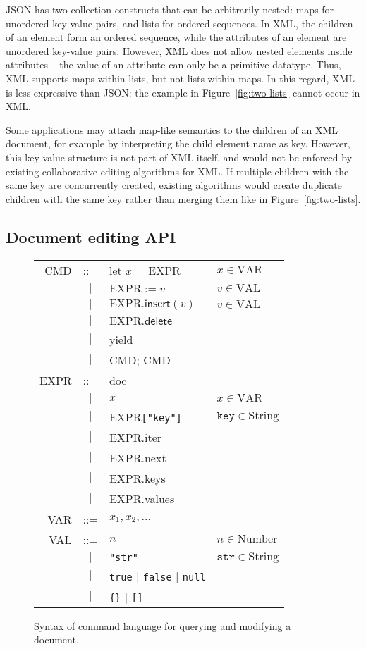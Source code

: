 \documentclass[10pt,journal,compsoc]{IEEEtran}
\begin{document}
JSON has two collection constructs that can be arbitrarily nested: maps for unordered key-value pairs, and lists for ordered sequences. In XML, the children of an element form an ordered sequence, while the attributes of an element are unordered key-value pairs. However, XML does not allow nested elements inside attributes -- the value of an attribute can only be a primitive datatype. Thus, XML supports maps within lists, but not lists within maps. In this regard, XML is less expressive than JSON: the example in Figure~\ref{fig:two-lists} cannot occur in XML.

Some applications may attach map-like semantics to the children of an XML document, for example by interpreting the child element name as key. However, this key-value structure is not part of XML itself, and would not be enforced by existing collaborative editing algorithms for XML. If multiple children with the same key are concurrently created, existing algorithms would create duplicate children with the same key rather than merging them like in Figure~\ref{fig:two-lists}.

\subsection{Document editing API}\label{sec:editing-api}

\begin{figure}
\centering
\begin{tabular}{rcll}
CMD & ::= & \textsf{let} $x$ = EXPR & $x \in \mathrm{VAR}$ \\
& $|$ & $\mathrm{EXPR} := v$ & $v \in \mathrm{VAL}$ \\
& $|$ & $\mathrm{EXPR}.\mathsf{insert}(v)$ & $v \in \mathrm{VAL}$ \\
& $|$ & $\mathrm{EXPR}.\mathsf{delete}$ \\
& $|$ & \textsf{yield} \\
& $|$ & CMD; CMD \vspace{0.5em}\\
EXPR & ::= & \textsf{doc} \\
& $|$ & $x$ & $x \in \mathrm{VAR}$ \\
& $|$ & EXPR\verb|["key"]| & $\mathtt{key} \in \mathrm{String}$ \\
& $|$ & EXPR.\textsf{iter} \\
& $|$ & EXPR.\textsf{next} \\
& $|$ & EXPR.\textsf{keys} \\
& $|$ & EXPR.\textsf{values} \vspace{0.5em}\\
VAR & ::= & ${x_1, x_2, \dots}$ \vspace{0.5em}\\
VAL & ::= & $n$ & $n \in \mathrm{Number}$ \\
& $|$ & \verb|"str"| & $\mathtt{str} \in \mathrm{String}$ \\
& $|$ & \verb|true| $|$ \verb|false| $|$ \verb|null| \\
& $|$ & \verb|{}| $|$ \verb|[]|
\end{tabular}
\caption{Syntax of command language for querying and modifying a document.}\label{fig:local-syntax}
\end{figure}
\end{document}
